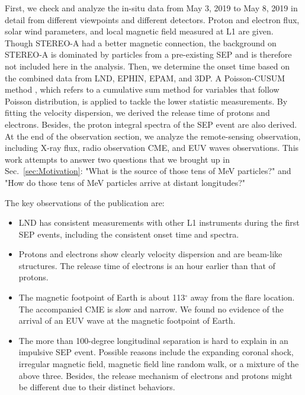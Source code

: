 First, we check and analyze the in-situ data from May 3, 2019 to May 8, 2019 in detail from different viewpoints and different detectors. Proton and electron flux, solar wind parameters, and local magnetic field measured at \ac{L1} are given.
Though \ac{STEREO}-A had a better magnetic connection, the background on \ac{STEREO}-A is dominated by particles from a pre-existing \ac{SEP} and is therefore not included here in the analysis.
Then, we determine the onset time based on the combined data from \ac{LND}, \ac{EPHIN}, \ac{EPAM}, and \acs{3DP}. A Poisson-CUSUM method \citep{Huttunen2005AA, Palmroos2022FrASS}, which refers to a cumulative sum method for variables that follow Poisson distribution, is applied to tackle the lower statistic measurements. By fitting the velocity dispersion, we derived the release time of protons and electrons. Besides, the proton integral spectra of the \ac{SEP} event are also derived. At the end of the observation section, we analyze the remote-sensing observation, including X-ray flux, radio observation \ac{CME}, and EUV waves observations. This work attempts to answer two questions that we brought up in Sec.~\ref{sec:Motivation}: "What is the source of those tens of MeV particles?" and "How do those tens of MeV particles arrive at distant longitudes?"


The key observations of the publication are:
\begin{itemize}
    \item \ac{LND} has consistent measurements with other \ac{L1} instruments during the first \ac{SEP} events, including the consistent onset time and spectra.
    \item Protons and electrons show clearly velocity dispersion and are beam-like structures. The release time of electrons is an hour earlier than that of protons.
    \item The magnetic footpoint of Earth is about 113$^\circ$ away from the flare location. The accompanied \ac{CME} is slow and narrow. We found no evidence of the arrival of an EUV wave at the magnetic footpoint of Earth. 
    \item The more than 100-degree longitudinal separation is hard to explain in an impulsive \ac{SEP} event. Possible reasons include the expanding coronal shock, irregular magnetic field, magnetic field line random walk, or a mixture of the above three. Besides, the release mechanism of electrons and protons might be different due to their distinct behaviors.
\end{itemize}


